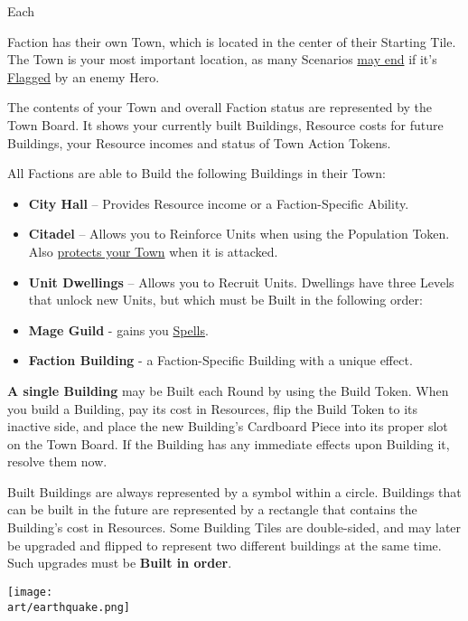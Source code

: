 
\begin{multicols*}{2}

\hypertarget{Town}{Each} Faction has their own Town, which is located in the center of their Starting Tile.
The Town is your most important location, as many Scenarios \hyperlink{End}{may end} if it's \hyperlink{Categories}{Flagged} by an enemy Hero.\par
The contents of your Town and overall Faction status are represented by the Town Board.
It shows your currently built Buildings, Resource costs for future Buildings, your Resource incomes and status of Town Action Tokens.\par
All Factions are able to Build the following Buildings in their Town:
\begin{itemize}
  \item \textbf{City Hall} – Provides Resource income or a Faction-Specific Ability.
  \item \textbf{Citadel} – Allows you to Reinforce Units when using the Population Token.
Also \hyperlink{Walls}{protects your Town} when it is attacked.
  \item \textbf{Unit Dwellings} – Allows you to Recruit Units.
Dwellings have three Levels that unlock new Units, but which must be Built in the following order:
  \item \textbf{Mage Guild} - gains you \hyperlink{spells}{Spells}.
  \item \textbf{Faction Building} - a Faction-Specific Building with a unique effect.
\end{itemize}
\textbf{A single Building} may be Built each Round by using the Build Token.
When you build a Building, pay its cost in Resources, flip the Build Token to its inactive side, and place the new Building’s Cardboard Piece into its proper slot on the Town Board.
If the Building has any immediate effects upon Building it, resolve them now.\par
Built Buildings are always represented by a symbol within a circle.
Buildings that can be built in the future are represented by a rectangle that contains the Building's cost in Resources.
Some Building Tiles are double-sided, and may later be upgraded and flipped to represent two different buildings at the same time. Such upgrades must be \textbf{Built in order}.\par

\vspace*{\fill}

\begin{center}
  \texttt{[image: \\art/earthquake.png]}
\end{center}

\vspace*{\fill}

\end{multicols*}
